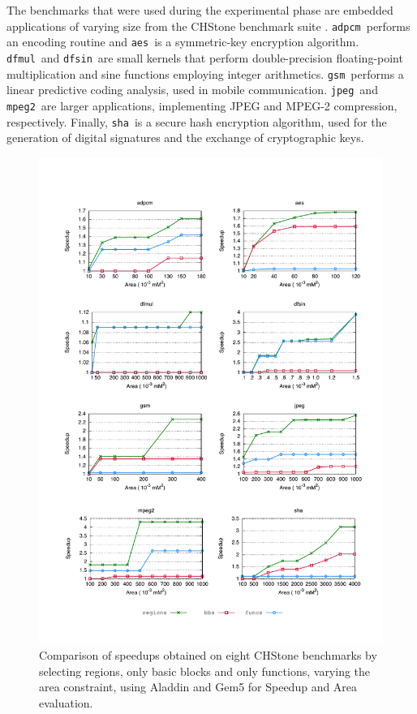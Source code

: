 \documentclass[]{usiinfthesis}
\newcommand{\adpcm}{\texttt{adpcm}}
\newcommand{\sha}{\texttt{sha}}
\newcommand{\jpeg}{\texttt{jpeg}}
\newcommand{\mpeg}{\texttt{mpeg2}}
\newcommand{\aes}{\texttt{aes}}
\newcommand{\dfmul}{\texttt{dfmul}}
\newcommand{\dfsin}{\texttt{dfsin}}
\newcommand{\gsm}{\texttt{gsm}}
\begin{document}
The benchmarks that were used during the experimental phase are embedded applications
of varying size from the CHStone benchmark suite \cite{HaraMay08}.
\adpcm\ performs an encoding routine and \aes\ is a symmetric-key encryption algorithm. 
\dfmul\ and \dfsin\ are small kernels that perform double-precision 
floating-point multiplication and sine functions employing integer arithmetics. 
\gsm\ performs a linear predictive coding analysis, used in mobile communication. 
\jpeg\ and \mpeg\ are larger applications, implementing JPEG and MPEG-2 compression, respectively.
Finally, \sha\ is a secure hash encryption algorithm, used for 
the generation of digital signatures and the exchange of cryptographic keys.\par

\begin{figure}[h!]
\centering
\hspace*{-1cm}
\includegraphics[width= 1.1 \linewidth]{figs/regions_aladdin}
\caption{Comparison of speedups obtained on eight CHStone benchmarks
  by selecting regions, only basic blocks and only functions, varying
  the area constraint, using Aladdin and Gem5 for Speedup and Area evaluation.}
\label{fig:regions_aladdin}
\end{figure}
\end{document}
